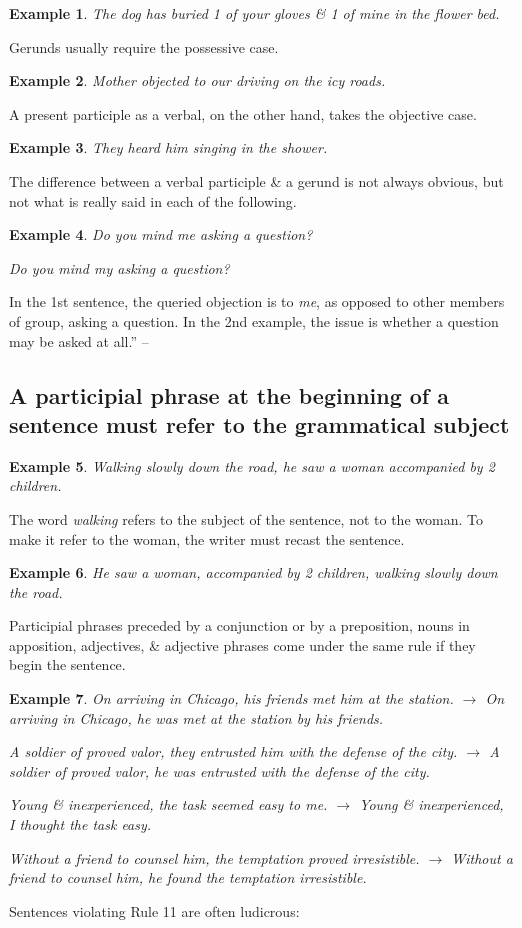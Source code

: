 \documentclass[oneside]{book}
\numberwithin{equation}{section}
\newtheorem{example}{Example}[chapter]
\begin{document}
\begin{example}
	The dog has buried 1 of your gloves \& 1 of mine in the flower bed.
\end{example}
Gerunds usually require the possessive case.

\begin{example}
	Mother objected to our driving on the icy roads.
\end{example}
A present participle as a verbal, on the other hand, takes the objective case.

\begin{example}
	They heard him singing in the shower.
\end{example}
The difference between a verbal participle \& a gerund is not always obvious, but not what is really said in each of the following.

\begin{example}
	Do you mind me asking a question?
	
	Do you mind my asking a question?
\end{example}
In the 1st sentence, the queried objection is to \textit{me}, as opposed to other members of group, asking a question. In the 2nd example, the issue is whether a question may be asked at all.'' -- \cite[Chap. 1, Sect. 10, pp. 25--26]{Strunk_White2019}

\subsection{A participial phrase at the beginning of a sentence must refer to the grammatical subject}

\begin{example}
	Walking slowly down the road, he saw a woman accompanied by 2 children.
\end{example}
The word \textit{walking} refers to the subject of the sentence, not to the woman. To make it refer to the woman, the writer must recast the sentence.

\begin{example}
	He saw a woman, accompanied by 2 children, walking slowly down the road.
\end{example}
Participial phrases preceded by a conjunction or by a preposition, nouns in apposition, adjectives, \& adjective phrases come under the same rule if they begin the sentence.

\begin{example}
	On arriving in Chicago, his friends met him at the station. $\to$ On arriving in Chicago, he was met at the station by his friends.
	
	A soldier of proved valor, they entrusted him with the defense of the city. $\to$ A soldier of proved valor, he was entrusted with the defense of the city.
	
	Young \& inexperienced, the task seemed easy to me. $\to$ Young \& inexperienced, I thought the task easy.
	
	Without a friend to counsel him, the temptation proved irresistible. $\to$ Without a friend to counsel him, he found the temptation irresistible.
\end{example}
Sentences violating Rule 11 are often ludicrous:
\end{document}
